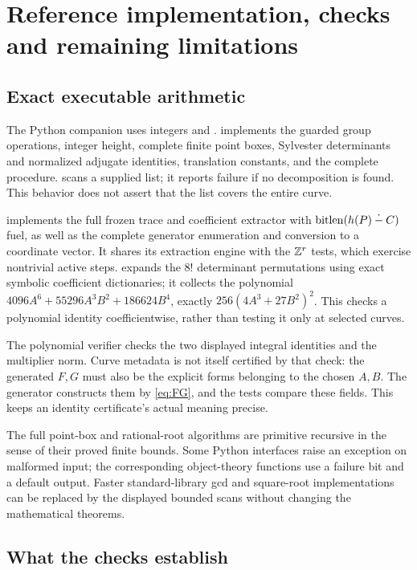 \section{Reference implementation, checks and remaining limitations}
\label{sec:validation}

\subsection{Exact executable arithmetic}

The Python companion uses integers and .
 implements the guarded group operations, integer
height, complete finite point boxes, Sylvester determinants and normalized
adjugate identities, translation constants, and the complete
 procedure.  scans a
supplied list; it reports failure if no decomposition is found.
This behavior does not assert that the list covers the entire curve.

 implements the full frozen trace and coefficient
extractor with $\operatorname{bitlen}(h(P)\mathbin{\mathord{\dot-}} C)$ fuel, as well as the complete
generator enumeration and conversion to a coordinate vector.
It shares its extraction engine with the $\mathbb Z^r$ tests, which exercise
nontrivial active steps.  expands the
$8!$ determinant permutations using exact symbolic coefficient dictionaries;
it collects the polynomial
$4096A^6+55296A^3B^2+186624B^4$, exactly
$256(4A^3+27B^2)^2$. This checks a polynomial identity coefficientwise,
rather than testing it only at selected curves.

The polynomial verifier checks the two displayed integral identities and
the multiplier norm. Curve metadata is not itself certified by that check:
the generated $F,G$ must also be the explicit forms belonging to the
chosen $A,B$. The generator constructs them by \eqref{eq:FG}, and the
tests compare these fields. This keeps an identity certificate's actual
meaning precise.

The full point-box and rational-root algorithms are primitive recursive
in the sense of their proved finite bounds. Some Python interfaces raise
an exception on malformed input; the corresponding object-theory
functions use a failure bit and a default output. Faster standard-library
gcd and square-root implementations can be replaced by the displayed
bounded scans without changing the mathematical theorems.

\subsection{What the checks establish}

